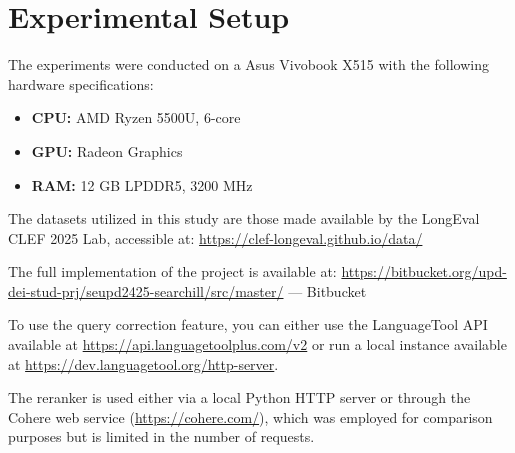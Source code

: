 \section{Experimental Setup}
\label{sec:setup}

The experiments were conducted on a Asus Vivobook X515 with the following hardware specifications:
\begin{itemize}
    \item \textbf{CPU:} AMD Ryzen 5500U, 6-core
    \item \textbf{GPU:} Radeon Graphics
    \item \textbf{RAM:} 12 GB LPDDR5, 3200 MHz
\end{itemize}

The datasets utilized in this study are those made available by the LongEval CLEF 2025 Lab, accessible at: \href{https://clef-longeval.github.io/data/}{https://clef-longeval.github.io/data/}

The full implementation of the project is available at: \href{https://bitbucket.org/upd-dei-stud-prj/seupd2425-searchill/src/master/}{https://bitbucket.org/upd-dei-stud-prj/seupd2425-searchill/src/master/} --- Bitbucket 

To use the query correction feature, you can either use the LanguageTool API available at \url{https://api.languagetoolplus.com/v2} or run a local instance available at \url{https://dev.languagetool.org/http-server}.

The reranker is used either via a local Python HTTP server or through the Cohere web service (\url{https://cohere.com/}), which was employed for comparison purposes but is limited in the number of requests.
